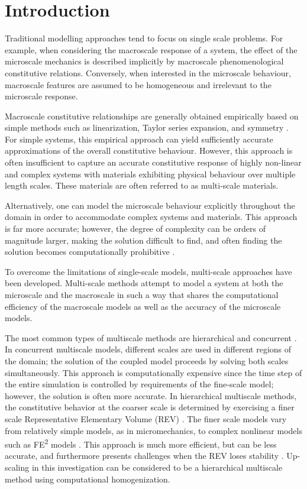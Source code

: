 \chapter{Introduction}
Traditional modelling approaches tend to focus on single scale problems. For example, when considering the macroscale response of a system, the effect of the microscale mechanics is described implicitly by macroscale phenomenological constitutive relations. Conversely, when interested in the microscale behaviour, macroscale features are assumed to be homogeneous and irrelevant to the microscale response. 

Macroscale constitutive relationships are generally obtained empirically based on simple methods such as linearization, Taylor series expansion, and symmetry \citep{weinan_principles_2011}. For simple systems, this empirical approach can yield sufficiently accurate approximations of the overall constitutive behaviour. However, this approach is often insufficient to capture an accurate constitutive response of highly non-linear and complex systems with materials exhibiting physical behaviour over multiple length scales. These materials are often referred to as multi-scale materials. 

Alternatively, one can model the microscale behaviour explicitly throughout the domain in order to accommodate complex systems and materials. This approach is far more accurate; however, the degree of complexity can be orders of magnitude larger, making the solution difficult to find, and often finding the solution becomes computationally prohibitive \citep{xu_multicale_2002}.

To overcome the limitations of single-scale models, multi-scale approaches have been developed. Multi-scale methods attempt to model a system at both the microscale and the macroscale in such a way that shares the computational efficiency of the macroscale models as well as the accuracy of the microscale models.

The most common types of multiscale methods are hierarchical and concurrent \citep{Gracie_2011}. In concurrent multiscale models, different scales are used in different regions of the domain; the solution of the coupled model proceeds by solving both scales simultaneously. This approach is computationally expensive since the time step of the entire simulation is controlled by requirements of the fine-scale model; however, the solution is often more accurate.  In hierarchical multiscale methods, the constitutive behavior at the coarser scale is determined by exercising a finer scale Representative Elementary Volume (REV) \citep{Li_2014}. The finer scale models vary from relatively simple models, as in micromechanics, to complex nonlinear models such as FE\textsuperscript{2} models \citep{Feyel_2003}. This approach is much more efficient, but can be less accurate, and furthermore  presents challenges when the REV loses stability \citep{Belytschko_2008}. Up-scaling in this investigation can be considered to be a hierarchical multiscale method using computational homogenization. 


